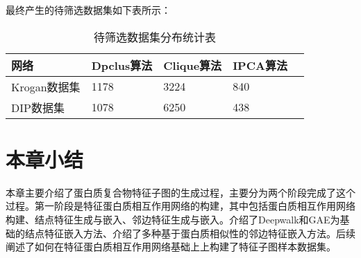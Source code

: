 最终产生的待筛选数据集如下表所示：

\begin{table}[h]
    \centering
    \caption{待筛选数据集分布统计表}
    \label{tab:datasets:statistic:beselect}
    \begin{tabular}{C{3cm}C{2cm}C{3cm}C{3cm}C{2cm}}
        \toprule
        \textbf{网络} & \textbf{Dpclus算法} & \textbf{Clique算法} & \textbf{IPCA算法} \\
        \midrule
        Krogan数据集  & 1178                & 3224                & 840               \\
        DIP数据集     & 1078                & 6250                & 438               \\
        \bottomrule
    \end{tabular}
\end{table}


\section{本章小结}
\label{section:FeatSubNetworkConstruct:summary}

本章主要介绍了蛋白质复合物特征子图的生成过程，主要分为两个阶段完成了这个过程。第一阶段是特征蛋白质相互作用网络的构建，其中包括蛋白质相互作用网络构建、结点特征生成与嵌入、邻边特征生成与嵌入。介绍了Deepwalk和GAE为基础的结点特征嵌入方法、介绍了多种基于蛋白质相似性的邻边特征嵌入方法。后续阐述了如何在特征蛋白质相互作用网络基础上上构建了特征子图样本数据集。
